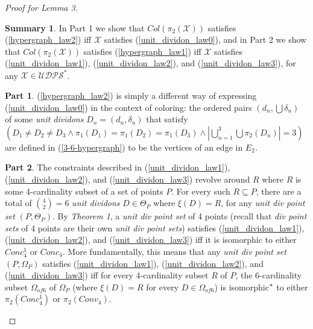 \documentclass[11pt, oneside]{article}      %
\theoremstyle{definition}
\newtheorem*{summary}{Summary}
\newtheorem{proofpart}{Part}[theo]
\numberwithin{equation}{section}
\newcommand{\reff}[1]{(\ref{#1})}
\theoremstyle{c}
\begin{document}
\begin{proof}[Proof for Lemma 3]  
\begin{summary} In Part 1 we show that $Col(\pi_2(\mathscr{X}))$ satisfies \reff{hypergraph_law2} iff $\mathscr{X}$ satisfies \reff{unit_dividon_law0}, and in Part 2 we show that $Col(\pi_2(\mathscr{X}))$ satisfies \reff{hypergraph_law1} iff $\mathscr{X}$ satisfies \reff{unit_dividon_law1}, \reff{unit_dividon_law2}, and \reff{unit_dividon_law3}, for any $\mathscr{X} \in \mathscr{UDPS}^*$.
\end{summary}
\setcounter{proofpart}{0}
\begin{proofpart}
\reff{hypergraph_law2} is simply a different way of expressing \reff{unit_dividon_law0} in the context of coloring: the ordered pairs $(d_n,\bigcup \delta_n)$ of some \textit{unit dividons} $D_n=(d_n,\delta_n)$ that satisfy $(D_1 \not = D_2 \not = D_3 \land \pi_1(D_1) = \pi_1(D_2) = \pi_1(D_3) \land |\bigcup_{n=1}^3 \bigcup \pi_2(D_n)| = 3)$ are defined in \reff{3-6-hypergraph} to be the vertices of an edge in $E_2$.
\end{proofpart}
\begin{proofpart}
The constraints described in \reff{unit_dividon_law1}, \reff{unit_dividon_law2}, and \reff{unit_dividon_law3} revolve around $R$ where $R$ is some 4-cardinality subset of a set of points $P$. For every such $R \subseteq P$, there are a total of $\binom{4}{2}=6$ \textit{unit dividons} $D \in \Theta_P$ where $\xi(D)=R$, for any \textit{unit div point set} $(P,\Theta_P)$. By \textit{Theorem 1}, a \textit{unit div point set} of 4 points (recall that \textit{div point sets} of 4 points are their own \textit{unit div point sets}) satisfies \reff{unit_dividon_law1}, \reff{unit_dividon_law2}, and \reff{unit_dividon_law3} iff it is isomorphic to either $Conc_4^1$ or $Conc_4$. More fundamentally, this means that any \textit{unit div point set} $(P,\Omega_P)$ satisfies \reff{unit_dividon_law1}, \reff{unit_dividon_law2}, and \reff{unit_dividon_law3} iff for every 4-cardinality subset $R$ of $P$,  the 6-cardinality subset $\Omega_{of 6}$ of $\Omega_P$ (where $\xi(D) = R$ for every $D \in \Omega_{of 6}$) is isomorphic$\color{black}^*$ to either $\pi_2(Conc_4^1)$ or $\pi_2(Conv_4)$. 


\end{proofpart}
\end{proof}
\end{document}
